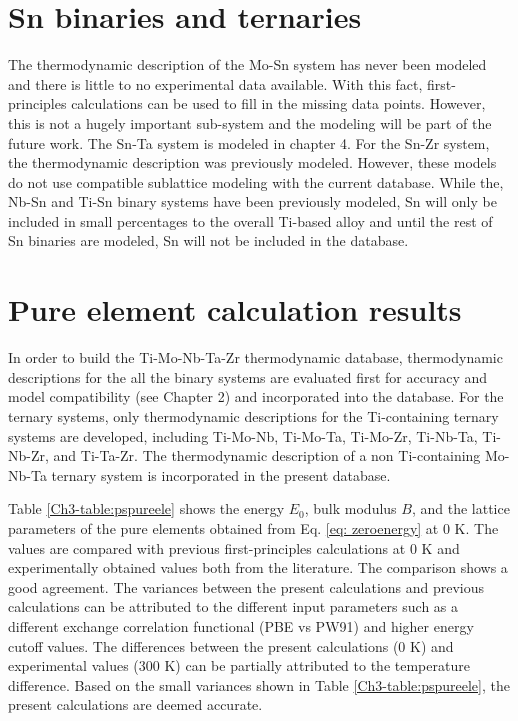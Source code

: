 \section{Sn binaries and ternaries}

The thermodynamic description of the Mo-Sn system has never been modeled and there is little to no experimental data available. With this fact, first-principles calculations can be used to fill in the missing data points. However, this is not a hugely important sub-system and the modeling will be part of the future work. The Sn-Ta system is modeled in chapter 4. For the Sn-Zr system, the thermodynamic description was previously modeled. However, these models do not use compatible sublattice modeling with the current database. While the, Nb-Sn and Ti-Sn binary systems have been previously modeled, Sn will only be included in small percentages to the overall Ti-based alloy and until the rest of Sn binaries are modeled, Sn will not be included in the database.

\section{Pure element calculation results}

In order to build the Ti-Mo-Nb-Ta-Zr thermodynamic database, thermodynamic descriptions for the all the binary systems are evaluated first for accuracy and model compatibility (see Chapter 2) and incorporated into the database. For the ternary systems, only thermodynamic descriptions for the Ti-containing ternary systems are developed, including Ti-Mo-Nb, Ti-Mo-Ta, Ti-Mo-Zr, Ti-Nb-Ta, Ti-Nb-Zr, and Ti-Ta-Zr. The thermodynamic description of a non Ti-containing Mo-Nb-Ta ternary system \cite{Xiong2004} is incorporated in the present database. 

Table \ref{Ch3-table:pspureele} shows the energy $E_{0}$, bulk modulus $B$, and the lattice parameters of the pure elements obtained from Eq. \ref{eq: zeroenergy} at 0 K. The values are compared with previous first-principles calculations at 0 K and experimentally obtained values both from the literature. The comparison shows a good agreement. The variances between the present calculations and previous calculations can be attributed to the different input parameters such as a different exchange correlation functional (PBE vs PW91) and higher energy cutoff values. The differences between the present calculations (0 K) and experimental values (300 K) can be partially attributed to the temperature difference. Based on the small variances shown in Table \ref{Ch3-table:pspureele}, the present calculations are deemed accurate. 


